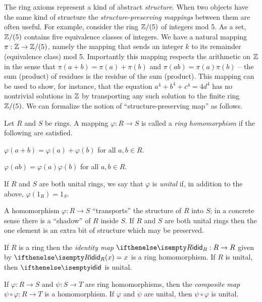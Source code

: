 The ring axioms represent a kind of abstract \emph{structure}.
When two objects have the same kind of structure the \emph{structure-preserving mappings} between them are often useful.
For example, consider the ring \(\mathbb{Z}/(5)\) of integers mod 5.
As a set, \(\mathbb{Z}/(5)\) contains five equivalence classes of integers.
We have a natural mapping \(\pi : \mathbb{Z} \rightarrow \mathbb{Z}/(5)\), namely the mapping that sends an integer \(k\) to its remainder (equivalence class) mod 5.
Importantly this mapping respects the arithmetic on \(\mathbb{Z}\) in the sense that \(\pi(a+b) = \pi(a) + \pi(b)\) and \(\pi(ab) = \pi(a)\pi(b)\) -- the sum (product) of residues is the residue of the sum (product).
This mapping can be used to show, for instance, that the equation \(a^4 + b^4 + c^4 = 4d^4\) has no nontrivial solutions in \(\mathbb{Z}\) by transporting any such solution to the finite ring \(\mathbb{Z}/(5)\).
We can formalize the notion of ``structure-preserving map'' as follows.

\begin{dfn} \label{dfn:ring-hom}
Let \(R\) and \(S\) be rings. A mapping \(\varphi : R \rightarrow S\) is called a \emph{ring homomorphism} if the following are satisfied.
\begin{proplist}
\item \(\varphi(a + b) = \varphi(a) + \varphi(b)\) for all \(a,b \in R\).
\item \(\varphi(ab) = \varphi(a)\varphi(b)\) for all \(a,b \in R\).
\end{proplist}
If \(R\) and \(S\) are both unital rings, we say that \(\varphi\) is \emph{unital} if, in addition to the above, \(\varphi(1_R) = 1_S\).
\end{dfn}

A homomorphism \(\varphi : R \rightarrow S\) ``transports'' the structure of \(R\) into \(S\); in a concrete sense there is a ``shadow'' of \(R\) inside \(S\).
If \(R\) and \(S\) are both unital rings then the one element is an extra bit of structure which may be preserved.

\begin{prop} \mbox{} \label{prop:ring-cat}
\begin{proplist}
\item \label{prop:ring-cat:id} If \(R\) is a ring then the \emph{identity map} \(\ID[R] : R \rightarrow R\) given by \(\ID[R](x) = x\) is a ring homomorphism.
If \(R\) is unital, then \(\ID\) is unital.
\item \label{prop:ring-cat:comp} If \(\varphi : R \rightarrow S\) and \(\psi : S \rightarrow T\) are ring homomorphisms, then the \emph{composite map} \(\psi \circ \varphi : R \rightarrow T\) is a homomorphism.
If \(\varphi\) and \(\psi\) are unital, then \(\psi \circ \varphi\) is unital.
\end{proplist}
\end{prop}


